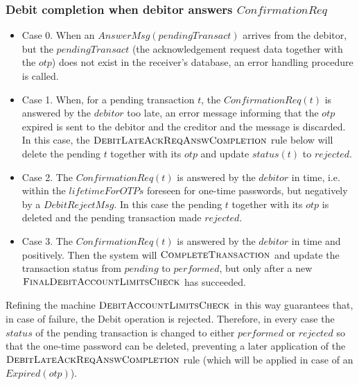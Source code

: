 \subsubsection{Debit completion when debitor answers $ConfirmationReq$}
\label{sect:debitack}
\begin{itemize}
\small
\item Case 0. When an $AnswerMsg(pendingTransact)$ arrives from the debitor, but the $pendingTransact$ (the acknowledgement request data together with the $otp$) does not exist in the receiver's database, an error handling procedure is called.
\item Case 1. When, for a pending transaction $t$, the $ConfirmationReq(t)$ is answered by the $debitor$ too late, an error message informing that the $otp$ expired is sent to the debitor and the creditor and the message is discarded. In this case, the $\hbox{\sc DebitLateAckReqAnswCompletion}$ rule below will delete the pending $t$ together with its $otp$ and update $status(t)$ to $rejected$.
 \item Case 2. The $ConfirmationReq(t)$ is answered by the $debitor$ in time, i.e. within the $lifetimeForOTPs$ foreseen for one-time passwords, but negatively by a $DebitRejectMsg$. In this case the pending $t$ together with its  $otp$ is deleted and the pending transaction made $rejected$.
\item Case 3. The $ConfirmationReq(t)$ is answered by the $debitor$ in time and positively. Then the system will $\hbox{\sc CompleteTransaction}$ and update the transaction status from $pending$ to $performed$, but only after a new $\hbox{\sc FinalDebitAccountLimitsCheck}$ has succeeded.
\vspace{-0.2cm}
\end{itemize}
Refining the machine $\hbox{\sc DebitAccountLimitsCheck}$ in this way guarantees that, in case of failure, the Debit operation is rejected. Therefore, in every case the $status$ of the pending transaction is changed to either $performed$ or $rejected$ so that the one-time password can be deleted,  preventing a later application of the $\hbox{\sc DebitLateAckReqAnswCompletion}$ rule (which will be applied in case of an $Expired(otp)$).
